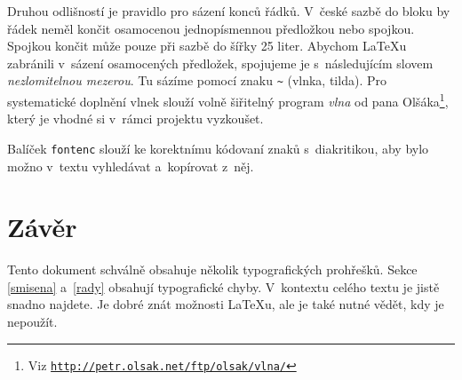 \documentclass[a4paper, 10pt, twocolumn]{article}
\begin{document}
        Druhou odlišností je pravidlo pro sázení konců řádků. V~české sazbě do bloku by řádek neměl končit osamocenou jednopísmennou předložkou nebo spojkou. Spojkou  končit může pouze při sazbě do šířky 25 liter. Abychom {\LaTeX}u zabránili v~sázení osamocených předložek, spojujeme je s~následujícím slovem \textit{nezlomitelnou mezerou}. Tu sázíme pomocí znaku \verb|~| (vlnka, tilda). Pro systematické doplnění vlnek slouží volně šiřitelný program \textit{vlna} od pana Olšáka\footnote{Viz \href{http://petr.olsak.net/ftp/olsak/vlna/}{\texttt{http://petr.olsak.net/ftp/olsak/vlna/}}}, který je vhodné si v~rámci projektu vyzkoušet.
        
        Balíček \texttt{fontenc} slouží ke korektnímu kódovaní znaků s~diakritikou, aby bylo možno v~textu vyhledávat a~kopírovat z~něj.

    \section{Závěr}\label{zaver}
        Tento dokument schválně obsahuje několik typografických prohřešků. Sekce \ref{smisena} a~\ref{rady} obsahují typografické chyby. V~kontextu celého textu je jistě snadno najdete. Je dobré znát možnosti {\LaTeX}u, ale je také nutné vědět, kdy je nepoužít.
    
\end{document}
